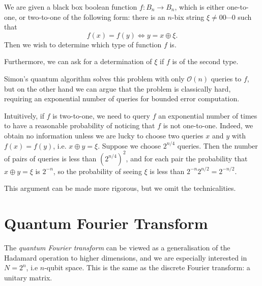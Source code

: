 \documentclass[12pt]{article}
\begin{document}
We are given a black box boolean function $f : B_n \to B_n$, which is either one-to-one, or two-to-one of the following form: there is an $n$-bix string $\xi \neq 00\cdots 0$ such that
\[
f(x) = f(y) \iff y = x \oplus \xi.
\]
Then we wish to determine which type of function $f$ is.

Furthermore, we can ask for a determination of $\xi$ if $f$ is of the second type.

Simon's quantum algorithm solves this problem with only $\mathcal{O}(n)$ queries to $f$, but on the other hand we can argue that the problem is classically hard, requiring an exponential number of queries for bounded error computation.

Intuitively, if $f$ is two-to-one, we need to query $f$ an exponential number of times to have a reasonable probability of noticing that $f$ is not one-to-one. Indeed, we obtain no information unless we are lucky to choose two queries $x$ and $y$ with $f(x) = f(y)$, i.e. $x \oplus y = \xi$. Suppose we choose $2^{n/4}$ queries. Then the number of pairs of queries is less than $(2^{n/4})^2$, and for each pair the probability that $x \oplus y = \xi$ is $2^{-n}$, so the probability of seeing $\xi$ is less than $2^{-n} 2^{n/2} = 2^{-n/2}$.

This argument can be made more rigorous, but we omit the technicalities.


\newpage

\section{Quantum Fourier Transform}
\label{sec:qft}

The \emph{quantum Fourier transform} can be viewed as a generalisation of the Hadamard operation to higher dimensions, and we are especially interested in $N = 2^n$, i.e $n$-qubit space. This is the same as the discrete Fourier transform: a unitary matrix.
\end{document}
